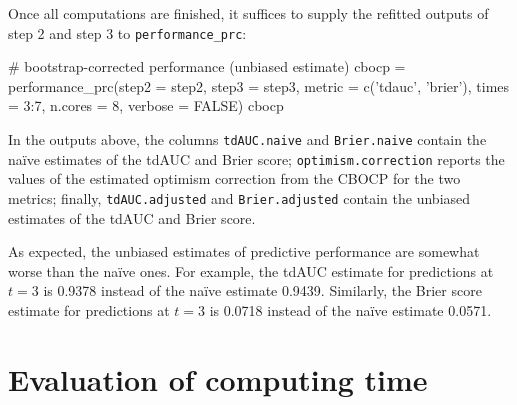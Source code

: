 Once all computations are finished, it suffices to supply the refitted
outputs of step 2 and step 3 to \texttt{performance\_prc}:

\begin{Schunk}
\begin{Sinput}
# bootstrap-corrected performance (unbiased estimate)
cbocp = performance_prc(step2 = step2, step3 =  step3, metric = c('tdauc', 'brier'), 
                        times = 3:7, n.cores = 8, verbose = FALSE)
cbocp
\end{Sinput}
\end{Schunk}

In the outputs above, the columns \texttt{tdAUC.naive} and
\texttt{Brier.naive} contain the naïve estimates of the tdAUC and Brier
score; \texttt{optimism.correction} reports the values of the estimated
optimism correction from the CBOCP for the two metrics; finally,
\texttt{tdAUC.adjusted} and \texttt{Brier.adjusted} contain the unbiased
estimates of the tdAUC and Brier score.

As expected, the unbiased estimates of predictive performance are
somewhat worse than the naïve ones. For example, the tdAUC estimate for
predictions at \(t = 3\) is 0.9378 instead of the naïve estimate 0.9439.
Similarly, the Brier score estimate for predictions at \(t = 3\) is
0.0718 instead of the naïve estimate 0.0571.

\section{Evaluation of computing
time}\label{evaluation-of-computing-time}

